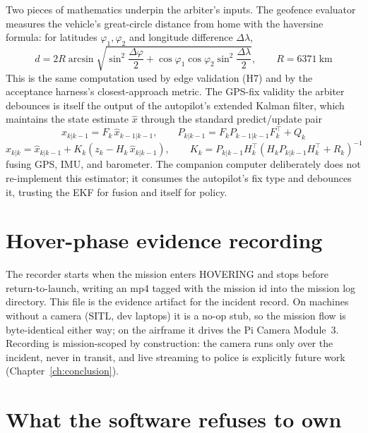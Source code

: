 \documentclass[12pt,a4paper]{report}
\begin{document}
Two pieces of mathematics underpin the arbiter's inputs. The geofence
evaluator measures the vehicle's great-circle distance from home with
the haversine formula: for latitudes $\varphi_1, \varphi_2$ and
longitude difference $\Delta\lambda$,
\begin{equation}
\label{eq:haversine}
d = 2R \arcsin\sqrt{\sin^2\!\frac{\Delta\varphi}{2} +
\cos\varphi_1 \cos\varphi_2 \sin^2\!\frac{\Delta\lambda}{2}},
\qquad R = 6371\ \mathrm{km}
\end{equation}
This is the same computation used by edge validation (H7) and by the
acceptance harness's closest-approach metric. The GPS-fix validity the
arbiter debounces is itself the output of the autopilot's extended
Kalman filter, which maintains the state estimate $\hat{x}$ through
the standard predict/update pair
\begin{equation}
\label{eq:ekfpredict}
\hat{x}_{k|k-1} = F_k\,\hat{x}_{k-1|k-1}, \qquad
P_{k|k-1} = F_k P_{k-1|k-1} F_k^{\top} + Q_k
\end{equation}
\begin{equation}
\label{eq:ekfupdate}
\hat{x}_{k|k} = \hat{x}_{k|k-1} +
K_k\left(z_k - H_k\,\hat{x}_{k|k-1}\right),
\qquad
K_k = P_{k|k-1} H_k^{\top}\left(H_k P_{k|k-1} H_k^{\top} +
R_k\right)^{-1}
\end{equation}
fusing GPS, IMU, and barometer. The companion computer deliberately
does not re-implement this estimator; it consumes the autopilot's fix
type and debounces it, trusting the EKF for fusion and itself for
policy.

\section{Hover-phase evidence recording}
\label{sec:camera}

The recorder starts when the mission enters HOVERING and stops before
return-to-launch, writing an mp4 tagged with the mission id into the mission
log directory. This file is the evidence artifact for the incident
record. On
machines without a camera (SITL, dev laptops) it is a no-op stub, so
the mission flow is byte-identical either way; on the airframe it
drives the Pi Camera Module~3. Recording is mission-scoped by
construction: the camera runs only over the incident, never in
transit, and live streaming to police is explicitly future work
(Chapter~\ref{ch:conclusion}).

\section{What the software refuses to own}
\label{sec:refuses}
\end{document}
